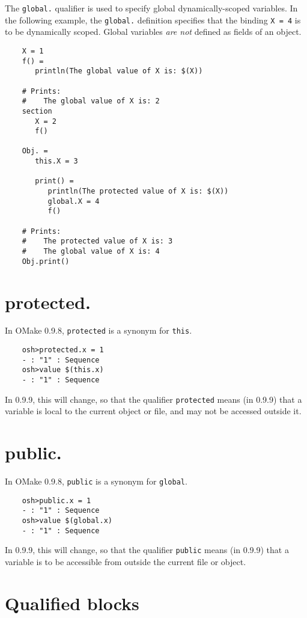 The \verb+global.+ qualifier is used to specify global dynamically-scoped variables.  In the following
example, the \verb+global.+ definition specifies that the binding \verb+X = 4+ is to be dynamically
scoped.  Global variables \emph{are not} defined as fields of an object.

\begin{verbatim}
    X = 1
    f() =
       println(The global value of X is: $(X))

    # Prints:
    #    The global value of X is: 2
    section
       X = 2
       f()

    Obj. =
       this.X = 3

       print() =
          println(The protected value of X is: $(X))
          global.X = 4
          f()

    # Prints:
    #    The protected value of X is: 3
    #    The global value of X is: 4
    Obj.print()
\end{verbatim}

\section{protected.}
\label{section:protected}

In OMake 0.9.8, \verb+protected+ is a synonym for \verb+this+.

\begin{verbatim}
    osh>protected.x = 1
    - : "1" : Sequence
    osh>value $(this.x)
    - : "1" : Sequence
\end{verbatim}
%
In 0.9.9, this will change, so that the qualifier \verb+protected+ means (in 0.9.9) that a variable
is local to the current object or file, and may not be accessed outside it.

\section{public.}
\label{section:public}

In OMake 0.9.8, \verb+public+ is a synonym for \verb+global+.

\begin{verbatim}
    osh>public.x = 1
    - : "1" : Sequence
    osh>value $(global.x)
    - : "1" : Sequence
\end{verbatim}
%
In 0.9.9, this will change, so that the qualifier \verb+public+ means (in 0.9.9) that a variable
is to be accessible from outside the current file or object.

\section{Qualified blocks}

